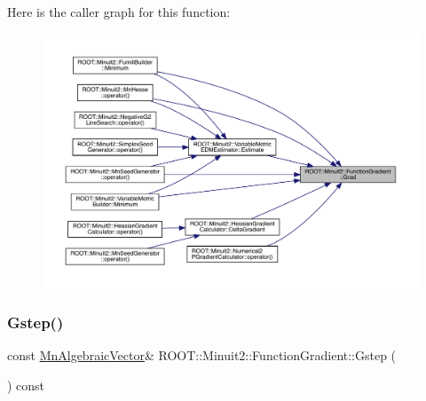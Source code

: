 Here is the caller graph for this function\+:
\nopagebreak
\begin{figure}[H]
\begin{center}
\leavevmode
\includegraphics[width=350pt]{d3/d48/classROOT_1_1Minuit2_1_1FunctionGradient_a0effb8dbe0115928f72f122621ba4ad3_icgraph}
\end{center}
\end{figure}
\mbox{\label{classROOT_1_1Minuit2_1_1FunctionGradient_a09cf6f34997cef2cffca0d9ccc2b36b8}} 
\subsubsection{\texorpdfstring{Gstep()}{Gstep()}\hspace{0.1cm}{\footnotesize\ttfamily [1/3]}}
{\footnotesize\ttfamily const \mbox{\hyperlink{namespaceROOT_1_1Minuit2_a62ed97730a1ca8d3fbaec64a19aa11c9}{Mn\+Algebraic\+Vector}}\& R\+O\+O\+T\+::\+Minuit2\+::\+Function\+Gradient\+::\+Gstep (\begin{DoxyParamCaption}{ }\end{DoxyParamCaption}) const\hspace{0.3cm}{\ttfamily [inline]}}

\mbox{\label{classROOT_1_1Minuit2_1_1FunctionGradient_a09cf6f34997cef2cffca0d9ccc2b36b8}} 
